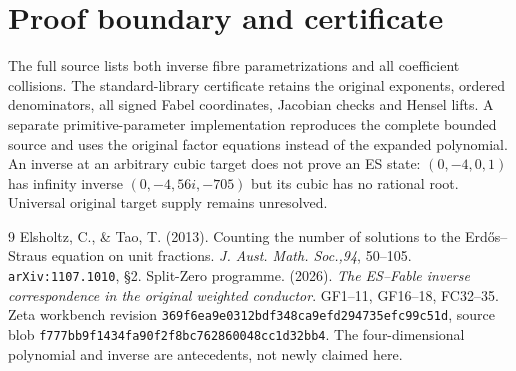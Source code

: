 \documentclass[11pt,reqno]{amsart}
\begin{document}
\section{Proof boundary and certificate}
The full source lists both inverse fibre parametrizations and all coefficient
collisions. The standard-library certificate retains the original exponents,
ordered denominators, all signed Fabel coordinates, Jacobian checks and Hensel
lifts. A separate primitive-parameter implementation reproduces the complete
bounded source and uses the original factor equations instead of the expanded
polynomial. An inverse at an arbitrary cubic target does not prove an ES state:
$(0,-4,0,1)$ has infinity inverse $(0,-4,56i,-705)$ but its cubic has no rational
root. Universal original target supply remains unresolved.

\begin{thebibliography}{9}
 Elsholtz, C., \& Tao, T. (2013). Counting the number of solutions
to the Erd\H{o}s--Straus equation on unit fractions. \emph{J. Aust. Math. Soc.,94},
50--105. \texttt{arXiv:1107.1010}, \S2.
 Split-Zero programme. (2026). \emph{The ES--Fable inverse
correspondence in the original weighted conductor}. GF1--11, GF16--18,
FC32--35. Zeta workbench revision \texttt{369f6ea9e0312bdf348ca9efd294735efc99c51d},
source blob \texttt{f777bb9f1434fa90f2f8bc762860048cc1d32bb4}.
The four-dimensional polynomial and inverse are antecedents, not newly claimed here.
\end{thebibliography}
\end{document}
